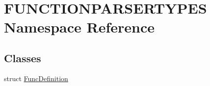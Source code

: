 \hypertarget{namespace_f_u_n_c_t_i_o_n_p_a_r_s_e_r_t_y_p_e_s}{}\section{F\+U\+N\+C\+T\+I\+O\+N\+P\+A\+R\+S\+E\+R\+T\+Y\+P\+ES Namespace Reference}
\label{namespace_f_u_n_c_t_i_o_n_p_a_r_s_e_r_t_y_p_e_s}
\subsection*{Classes}
\begin{DoxyCompactItemize}
\item 
struct \hyperlink{struct_f_u_n_c_t_i_o_n_p_a_r_s_e_r_t_y_p_e_s_1_1_func_definition}{Func\+Definition}
\end{DoxyCompactItemize}
